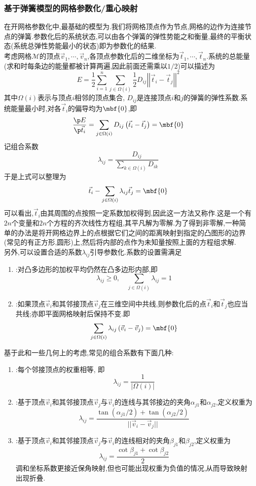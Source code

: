 \documentclass{ctexart}
\begin{document}
\subsubsection{基于弹簧模型的网格参数化/重心映射}
\indent 在开网格参数化中,最基础的模型为.我们将网格顶点作为节点,网格的边作为连接节点的弹簧.参数化后的系统状态,可以由各个弹簧的弹性势能之和衡量,最终的平衡状态(系统总弹性势能最小的状态)即为参数化的结果.\\
\indent 考虑网格$\mathcal{M}$的顶点$\vec{v}_1,\cdots,\vec{v}_n$,各顶点参数化后的二维坐标为$\vec{t}_1,\cdots,\vec{t}_n$.系统的总能量(求和时每条边的能量都被计算两遍,因此前面还需乘以$1/2$)可以描述为
\[E=\dfrac12\sum_{i=1}^{n}\sum_{j\in\Omega(i)}\dfrac12D_{ij}\left|\left|\vec{t}_i-\vec{t}_j\right|\right|^2\]
其中$\Omega(i)$表示与顶点$i$相邻的顶点集合, $D_{ij}$是连接顶点$i$和$j$的弹簧的弹性系数.系统能量最小时,对各$\vec{t}_i$的偏导均为$\mbf{0}$,即
\[\dfrac{\p E}{\p\vec{t}_i}=\sum_{j\in\Omega(i)}D_{ij}\left(\vec{t}_i-\vec{t}_j\right)=\mbf{0}\]
记组合系数
\[\lambda_{ij}=\dfrac{D_{ij}}{\displaystyle\sum_{k\in\Omega(i)}D_{ik}}\]
于是上式可以整理为
\[\vec{t}_i-\sum_{j\in\Omega(i)}\lambda_{ij}\vec{t}_j=\mbf{0}\]
可以看出,$\vec{t}_i$由其周围的点按照一定系数加权得到,因此这一方法又称作.这是一个有$2n$个变量和$2n$个方程的齐次线性方程组,其平凡解为零解.为了得到非零解,一种简单的办法是将开网格边界上的点根据它们之间的距离映射到指定的凸图形的边界(常见的有正方形,圆形)上,然后将内部的点作为未知量按照上面的方程组求解.\\
\indent 另外,可以设置合适的系数$\lambda_{ij}$引导参数化.系数的设置需满足
\begin{enumerate}[topsep=0pt,parsep=0pt,itemsep=0pt,partopsep=0pt]
    \item {}:对凸多边形的加权平均仍然在凸多边形内部,即
        \[\lambda_{ij}\geqslant0,\quad \sum_{j\in\Omega(i)}\lambda_{ij}=1\]
    \item {}:如果顶点$\vec{v}_i$和其邻接顶点$\vec{v}_j$在三维空间中共线,则参数化后的点$\vec{t}_i$和$\vec{t}_j$也应当共线;亦即平面网格映射后保持不变.即
        \[\sum_{j\in\Omega(i)}\lambda_{ij}\left(\vec{v}_i-\vec{v}_j\right)=\mbf{0}\]
\end{enumerate}
基于此和一些几何上的考虑,常见的组合系数有下面几种:
\begin{enumerate}[topsep=0pt,parsep=0pt,itemsep=0pt,partopsep=0pt]
    \item {}:每个邻接顶点的权重相等, 即
        \[\lambda_{ij}=\dfrac{1}{|\Omega(i)|}\]
    \item {}:基于顶点$\vec{v}_i$和其邻接顶点$\vec{v}_j$与$\vec{v}_i$的连线与其邻接边的夹角$\alpha_{j1}$和$\alpha_{j2}$,定义权重为
        \[\lambda_{ij}=\dfrac{\tan\left(\alpha_{j1}/2\right)+\tan\left(\alpha_{j2}/2\right)}{||\vec{v}_i-\vec{v}_j||}\]
    \item {}:基于顶点$\vec{v}_i$和其邻接顶点$\vec{v}_j$与$\vec{v}_i$的连线相对的夹角$\beta_{j1}$和$\beta_{j2}$,定义权重为
        \[\lambda_{ij}=\dfrac{\cot\beta_{j1}+\cot\beta_{j2}}{2}\]
        调和坐标系数更接近保角映射,但也可能出现权重为负值的情况,从而导致映射出现折叠.
\end{enumerate}
\end{document}
